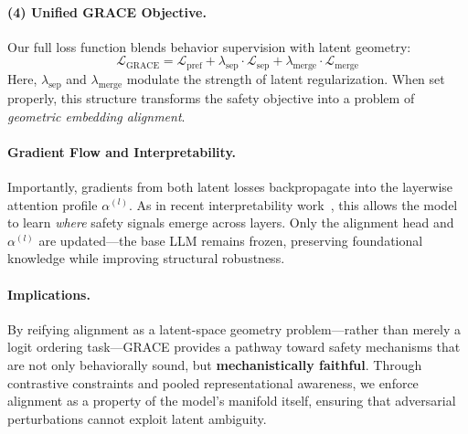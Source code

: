 \paragraph{(4) Unified GRACE Objective.}
Our full loss function blends behavior supervision with latent geometry:
\[
\mathcal{L}_{\mathrm{GRACE}} = \mathcal{L}_{\mathrm{pref}} + \lambda_{\mathrm{sep}} \cdot \mathcal{L}_{\mathrm{sep}} + \lambda_{\mathrm{merge}} \cdot \mathcal{L}_{\mathrm{merge}}
\]
Here, \( \lambda_{\mathrm{sep}} \) and \( \lambda_{\mathrm{merge}} \) modulate the strength of latent regularization. When set properly, this structure transforms the safety objective into a problem of \emph{geometric embedding alignment}.

\paragraph{Gradient Flow and Interpretability.}
Importantly, gradients from both latent losses backpropagate into the layerwise attention profile \( \alpha^{(l)} \). As in recent interpretability work~\cite{belrose2023language, mu2023layers}, this allows the model to learn \textit{where} safety signals emerge across layers. Only the alignment head and \( \alpha^{(l)} \) are updated—the base LLM remains frozen, preserving foundational knowledge while improving structural robustness.

\paragraph{Implications.}
By reifying alignment as a latent-space geometry problem—rather than merely a logit ordering task—GRACE provides a pathway toward safety mechanisms that are not only behaviorally sound, but \textbf{mechanistically faithful}. Through contrastive constraints and pooled representational awareness, we enforce alignment as a property of the model’s manifold itself, ensuring that adversarial perturbations cannot exploit latent ambiguity.


































